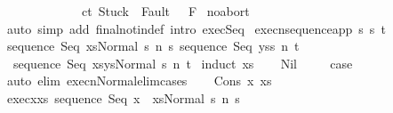 \begin{isabellebody}
\ \ \ \ \ \ \ \ \ \ \ \ \ {\isasymGamma}{\isasymturnstile}{\isasymlangle}c{}{\isacharcomma}t{\isasymrangle}\ {\isasymRightarrow}{\isasymnotin}{\isacharparenleft}{\isacharbraceleft}Stuck{\isacharbraceright}\ {\isasymunion}\ Fault\ {\isacharbackquote}\ \ F{\isacharparenright}{\isachardoublequoteclose}\isanewline
%
\isadelimproof
%
\endisadelimproof
%
\isatagproof
{}\isamarkupfalse%
\ noabort\isanewline
{}\isamarkupfalse%
\ {\isacharparenleft}auto\ simp\ add{\isacharcolon}\ final{\isacharunderscore}notin{\isacharunderscore}def\ intro{\isacharcolon}\ exec{\isacharunderscore}Seq{\isacharprime}{\isacharparenright}%
\endisatagproof
{\isafoldproof}%
%
\isadelimproof
%
\endisadelimproof
%
\isamarkuptrue%
\isamarkupfalse%
\ execn{\isacharunderscore}sequence{\isacharunderscore}app{\isacharcolon}\ {\isachardoublequoteopen}{\isasymAnd}s\ s{\isacharprime}\ t{\isachardot}\isanewline
\ {\isasymlbrakk}{\isasymGamma}{\isasymturnstile}{\isasymlangle}sequence\ Seq\ xs{\isacharcomma}Normal\ s{\isasymrangle}\ {\isacharequal}n{\isasymRightarrow}\ s{\isacharprime}{\isacharsemicolon}\ {\isasymGamma}{\isasymturnstile}{\isasymlangle}sequence\ Seq\ ys{\isacharcomma}s{\isacharprime}{\isasymrangle}\ {\isacharequal}n{\isasymRightarrow}\ t{\isasymrbrakk}\isanewline
\ {\isasymLongrightarrow}\ {\isasymGamma}{\isasymturnstile}{\isasymlangle}sequence\ Seq\ {\isacharparenleft}xs{\isacharat}ys{\isacharparenright}{\isacharcomma}Normal\ s{\isasymrangle}\ {\isacharequal}n{\isasymRightarrow}\ t{\isachardoublequoteclose}\isanewline
%
\isadelimproof
%
\endisadelimproof
%
\isatagproof
{}\isamarkupfalse%
\ {\isacharparenleft}induct\ xs{\isacharparenright}\isanewline
\ \ \isamarkupfalse%
\ Nil\ \isanewline
\ \ \isamarkupfalse%
\ {\isacharquery}case\ \isamarkupfalse%
\ {\isacharparenleft}auto\ elim{\isacharcolon}\ execn{\isacharunderscore}Normal{\isacharunderscore}elim{\isacharunderscore}cases{\isacharparenright}\isanewline
{}\isamarkupfalse%
\isanewline
\ \ \isamarkupfalse%
\ {\isacharparenleft}Cons\ x\ xs{\isacharparenright}\isanewline
\ \ \isamarkupfalse%
\ exec{\isacharunderscore}x{\isacharunderscore}xs{\isacharcolon}\ {\isachardoublequoteopen}{\isasymGamma}{\isasymturnstile}{\isasymlangle}sequence\ Seq\ {\isacharparenleft}x\ {\isacharhash}\ xs{\isacharparenright}{\isacharcomma}Normal\ s{\isasymrangle}\ {\isacharequal}n{\isasymRightarrow}\ s{\isacharprime}{\isachardoublequoteclose}\ \isamarkupfalse%

\end{isabellebody}
